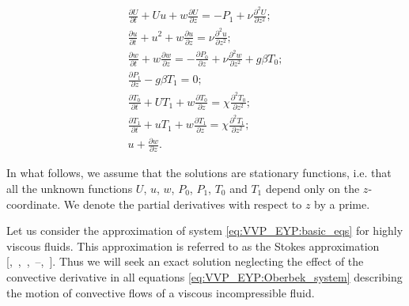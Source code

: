 \begin{gather}

\frac{\partial U}{\partial t} +U u+w\frac{\partial U}{\partial z}=-P_1+\nu \frac{\partial^2 U}{\partial z^2};

\\

\frac{\partial u}{\partial t} + u^2+w\frac{\partial u}{\partial z}=\nu \frac{\partial^2 u}{\partial z^2};

\\

\frac{\partial w}{\partial t} + w \frac{\partial w}{\partial z}=-\frac{\partial P_0}{\partial z}+\nu \frac{\partial^2 w}{\partial z^2}+g\beta T_0;

\\

\frac{\partial P_1}{\partial z}-g\beta T_1=0;        \label{eq:VVP_EYP:basic_eqs}

\\

\frac{\partial T_0}{\partial t} + U T_1 +w \frac{\partial T_0}{\partial z}=\chi \frac{\partial^2 T_0}{\partial z^2};

\\

\frac{\partial T_1}{\partial t} + u T_1 +w \frac{\partial T_1}{\partial z}=\chi \frac{\partial^2 T_1}{\partial z^2};

\\

u + \frac{\partial w}{\partial z}.

 \end{gather}



In what follows, we assume that the solutions are stationary functions, i.e. that all the unknown functions $U$, $u$, $w$, $P_0$, $P_1$, $T_0$ and $T_1$ depend only on the $z$-coordinate. We denote the partial derivatives with respect to $z$ by a prime.



Let us consider the approximation of system \eqref{eq:VVP_EYP:basic_eqs} for highly viscous fluids. This approximation is referred to as the Stokes approximation [,~,~,~--,~]. Thus we will seek an exact solution neglecting the effect of the convective derivative in all equations \eqref{eq:VVP_EYP:Oberbek_system} describing the motion of convective flows of a viscous incompressible fluid. 

